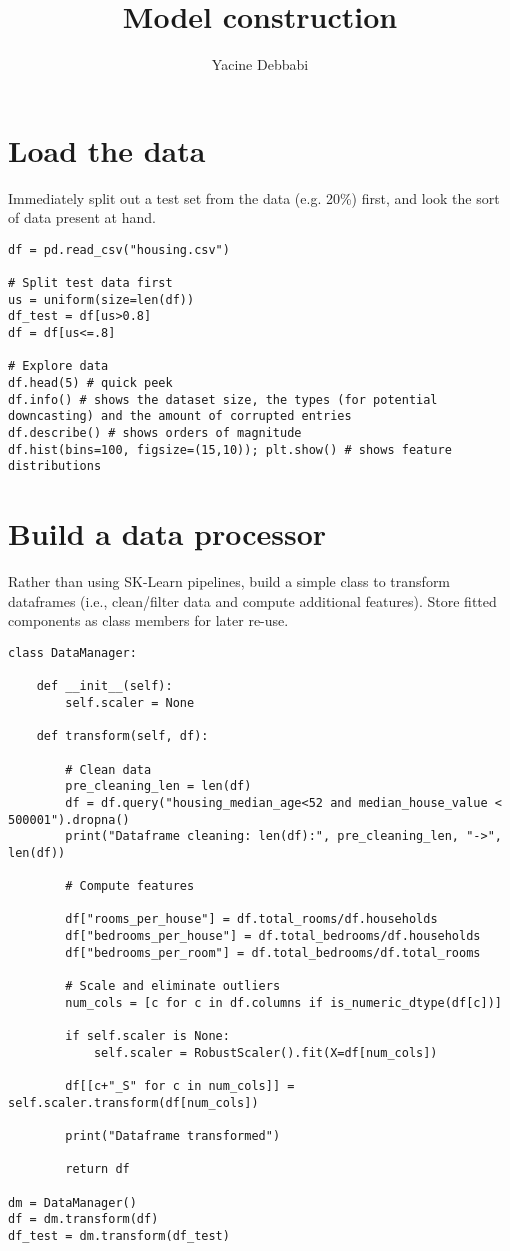\documentclass[]{article}
\title{\textbf{Model construction}}
\author{Yacine Debbabi}
\begin{document}
\maketitle

\tableofcontents

\section{Load the data}

Immediately split out a test set from the data (e.g. 20\%) first, and look the sort of data present at hand.

\begin{lstlisting}
df = pd.read_csv("housing.csv")

# Split test data first
us = uniform(size=len(df))
df_test = df[us>0.8]
df = df[us<=.8]

# Explore data
df.head(5) # quick peek
df.info() # shows the dataset size, the types (for potential downcasting) and the amount of corrupted entries
df.describe() # shows orders of magnitude
df.hist(bins=100, figsize=(15,10)); plt.show() # shows feature distributions
\end{lstlisting}

\section{Build a data processor}

Rather than using SK-Learn pipelines, build a simple class to transform dataframes (i.e., clean/filter data and compute additional features). Store fitted components as class members for later re-use.

\begin{lstlisting}
class DataManager:
    
    def __init__(self):
        self.scaler = None

    def transform(self, df):
        
        # Clean data
        pre_cleaning_len = len(df)
        df = df.query("housing_median_age<52 and median_house_value < 500001").dropna()
        print("Dataframe cleaning: len(df):", pre_cleaning_len, "->", len(df))
        
        # Compute features

        df["rooms_per_house"] = df.total_rooms/df.households
        df["bedrooms_per_house"] = df.total_bedrooms/df.households
        df["bedrooms_per_room"] = df.total_bedrooms/df.total_rooms
            
        # Scale and eliminate outliers
        num_cols = [c for c in df.columns if is_numeric_dtype(df[c])]
        
        if self.scaler is None:
            self.scaler = RobustScaler().fit(X=df[num_cols])
            
        df[[c+"_S" for c in num_cols]] = self.scaler.transform(df[num_cols])
            
        print("Dataframe transformed")
        
        return df

dm = DataManager()
df = dm.transform(df)
df_test = dm.transform(df_test)
\end{lstlisting}
\end{document}
